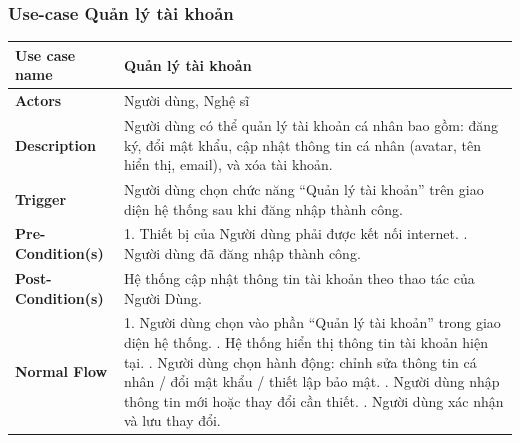 \documentclass[a4paper]{article}
\begin{document}
\subsubsection{Use-case Quản lý tài khoản}
\begin{table}[H]
	\centering
	\renewcommand{\arraystretch}{1.3} %
	\begin{tabularx}{\textwidth}{|l|X|}
		\hline
		\textbf{Use case name} & Quản lý tài khoản                                                                                                                                       \\ \hline
		\textbf{Actors}        & Người dùng, Nghệ sĩ                                                                                                                                     \\ \hline
		\textbf{Description}   & Người dùng có thể quản lý tài khoản cá nhân bao gồm: đăng ký, đổi mật khẩu, cập nhật thông tin cá nhân (avatar, tên hiển thị, email), và xóa tài khoản. \\ \hline
		\textbf{Trigger}       & Người dùng chọn chức năng “Quản lý tài khoản” trên giao diện hệ thống sau khi đăng nhập thành công.                                                     \\ \hline
		\textbf{Pre-Condition(s)}
		                       & 1. Thiết bị của Người dùng phải được kết nối internet. \newline
		2. Người dùng đã đăng nhập thành công.                                                                                                                                           \\ \hline
		\textbf{Post-Condition(s)}
		                       & Hệ thống cập nhật thông tin tài khoản theo thao tác của Người Dùng.                                                                                     \\ \hline
		\textbf{Normal Flow}
		                       & 1. Người dùng chọn vào phần “Quản lý tài khoản” trong giao diện hệ thống. \newline
		2. Hệ thống hiển thị thông tin tài khoản hiện tại. \newline
		3. Người dùng chọn hành động: chỉnh sửa thông tin cá nhân / đổi mật khẩu / thiết lập bảo mật. \newline
		4. Người dùng nhập thông tin mới hoặc thay đổi cần thiết. \newline
		5. Người dùng xác nhận và lưu thay đổi. \newline

\end{tabularx}
\end{table}
\end{document}
